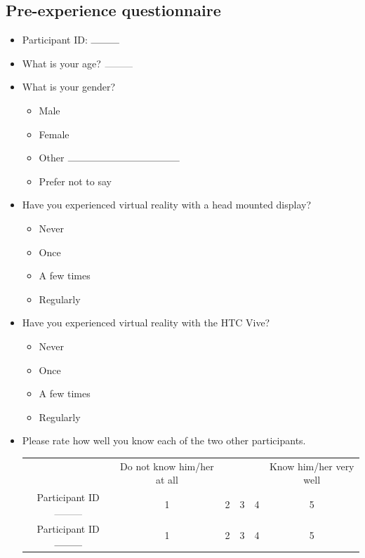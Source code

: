 \documentclass[]{simple-thesis}
\begin{document}
\begin{appendices}


\chapter{Pre-experience questionnaire}\label{appendix:questionnaire:pre}

\begin{itemize}

\item Participant ID: $\rule{1cm}{0.1mm}$

\item What is your age? $\rule{1cm}{0.1mm}$

\item What is your gender?

\begin{itemize}
  \item Male
  \item Female
  \item Other $\rule{4cm}{0.1mm}$
  \item Prefer not to say
\end{itemize}

\item Have you experienced virtual reality with a head mounted display?

\begin{itemize}
  \item Never
  \item Once
  \item A few times
  \item Regularly
\end{itemize}

\item Have you experienced virtual reality with the HTC Vive?

\begin{itemize}
  \item Never
  \item Once
  \item A few times
  \item Regularly
\end{itemize}

\item Please rate how well you know each of the two other participants.

\begin{tabular}{c|C C C C C}
  & Do not know him/her at all & & & & Know him/her very well \\
  Participant ID $\rule{1cm}{0.1mm}$ & 1 & 2 & 3 & 4 & 5\\
  Participant ID $\rule{1cm}{0.1mm}$ & 1 & 2 & 3 & 4 & 5\\
\end{tabular}


\end{itemize}
\end{appendices}
\end{document}
